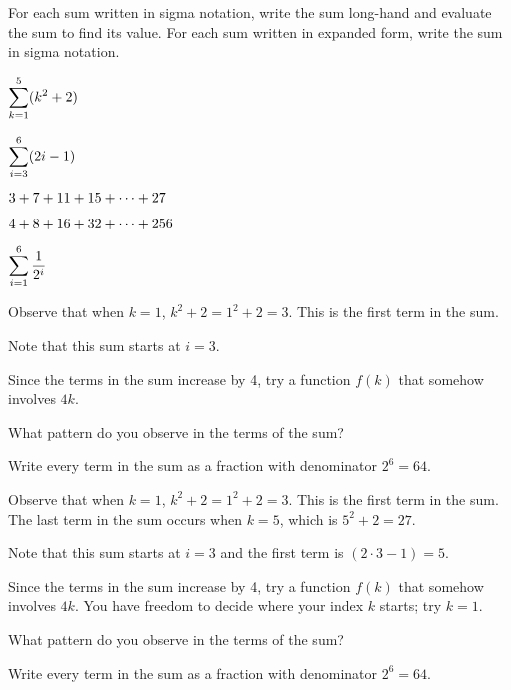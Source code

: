 \begin{activity} \label{A:4.2.1}  For each sum written in sigma notation, write the sum long-hand and evaluate the sum to find its value.  For each sum written in expanded form, write the sum in sigma notation.
\ba
	\item $\displaystyle \sum_{k=1}^{5} (k^2 + 2)$
	\item $\displaystyle \sum_{i=3}^{6} (2i-1)$
	\item $\displaystyle 3 + 7 + 11 + 15 +  \cdots + 27$
	\item $\displaystyle 4 + 8 + 16 + 32 + \cdots + 256$
	\item $\displaystyle \sum_{i=1}^{6} \frac{1}{2^i}$
\ea
\end{activity}
\begin{smallhint}
\ba
	\item Observe that when $k = 1$, $k^2 + 2 = 1^2 + 2 = 3$.  This is the first term in the sum.
	\item Note that this sum starts at $i = 3$.
	\item Since the terms in the sum increase by 4, try a function $f(k)$ that somehow involves $4k$.
	\item What pattern do you observe in the terms of the sum?
	\item Write every term in the sum as a fraction with denominator $2^6 = 64$.
\ea
\end{smallhint}
\begin{bighint}
\ba
	\item Observe that when $k = 1$, $k^2 + 2 = 1^2 + 2 = 3$.  This is the first term in the sum.  The last term in the sum occurs when $k = 5$, which is $5^2 + 2 = 27$.
	\item Note that this sum starts at $i = 3$ and the first term is $(2\cdot 3 - 1) = 5$.
	\item Since the terms in the sum increase by 4, try a function $f(k)$ that somehow involves $4k$.  You have freedom to decide where your index $k$ starts; try $k = 1$.
	\item What pattern do you observe in the terms of the sum?
	\item Write every term in the sum as a fraction with denominator $2^6 = 64$.
\ea
\end{bighint}
